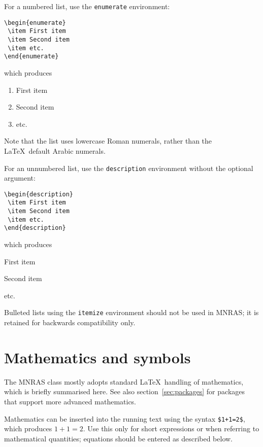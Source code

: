 \documentclass[fleqn,usenatbib,useAMS]{mnras}
\begin{document}
For a numbered list, use the \verb'enumerate' environment:
\begin{verbatim}
\begin{enumerate}
 \item First item
 \item Second item
 \item etc.
\end{enumerate}
\end{verbatim}
\noindent which produces
\begin{enumerate}
 \item First item
 \item Second item
 \item etc.
\end{enumerate}
Note that the list uses lowercase Roman numerals, rather than the \LaTeX\ default Arabic numerals.

For an unnumbered list, use the \verb'description' environment without the optional argument:
\begin{verbatim}
\begin{description}
 \item First item
 \item Second item
 \item etc.
\end{description}
\end{verbatim}
\noindent which produces
\begin{description}
 \item First item
 \item Second item
 \item etc.
\end{description}

Bulleted lists using the \verb'itemize' environment should not be used in MNRAS; it is retained for backwards compatibility only.

\section{Mathematics and symbols}

The MNRAS class mostly adopts standard \LaTeX\ handling of mathematics, which is briefly summarised here.
See also section~\ref{sec:packages} for packages that support more advanced mathematics.

Mathematics can be inserted into the running text using the syntax \verb'$1+1=2$', which produces $1+1=2$.
Use this only for short expressions or when referring to mathematical quantities; equations should be entered as described below.
\end{document}
